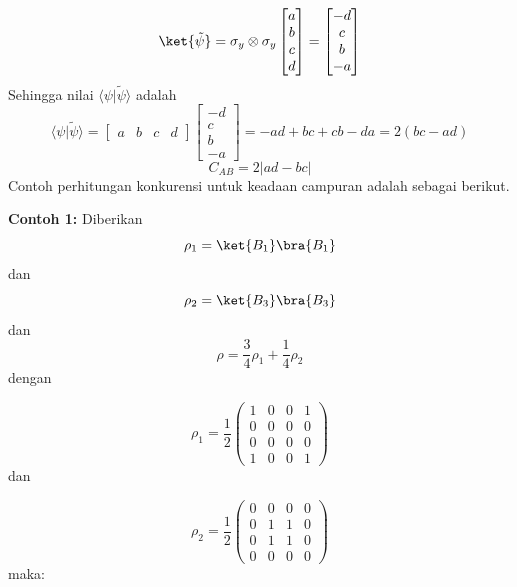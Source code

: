\begin{equation*}
	\ket{\tilde{\psi}} = \sigma_y \otimes \sigma_y \begin{bmatrix}
		a \\ b \\ c \\ d    \end{bmatrix} = \begin{bmatrix}-d \\ c \\ b \\ -a    
	\end{bmatrix}
\end{equation*}
Sehingga nilai $\langle{\psi} |{\tilde{\psi}}\rangle$ adalah
\begin{equation*}
	\langle{\psi} |{\tilde{\psi}}\rangle = \begin{bmatrix}
		a & b & c & d    
	\end{bmatrix} \begin{bmatrix}-d \\ c \\ b \\ -a    
	\end{bmatrix} = -ad + bc + cb - da = 2(bc - ad)
\end{equation*}
\begin{equation*}
	C_{AB} = 2|ad - bc|
\end{equation*}
Contoh perhitungan konkurensi untuk keadaan campuran adalah sebagai berikut.

\textbf{Contoh 1:} 
Diberikan 
\begin{equation}
	\rho_1 = \ket{B_1}\bra{B_1}
\end{equation}
dan
\begin{equation}
	\rho_2 = \ket{B_3}\bra{B_3}
\end{equation}
dan
\begin{equation}
	\rho = \frac{3}{4}\rho_1 + \frac{1}{4}\rho_2
\end{equation}
dengan

\begin{equation}
	\rho_1 = \frac{1}{2}
	\begin{pmatrix}
		1&0&0&1\\
		0&0&0&0\\
		0&0&0&0\\
		1&0&0&1
	\end{pmatrix}
\end{equation}
dan

\begin{equation}
	\rho_2 = \frac{1}{2}
	\begin{pmatrix}
		0&0&0&0\\
		0&1&1&0\\
		0&1&1&0\\
		0&0&0&0
	\end{pmatrix}
\end{equation}
maka:  

